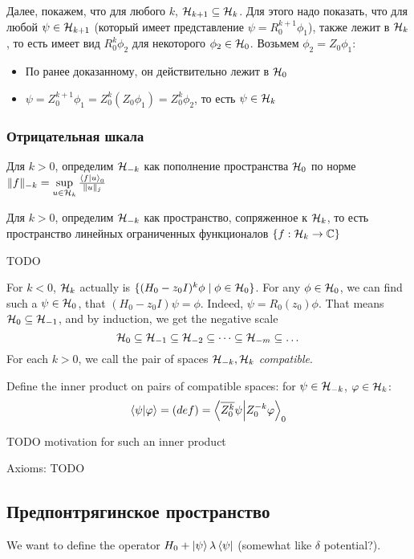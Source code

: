 Далее, покажем, что для любого $k$, $\mathcal{H}_{k + 1} \subseteq \mathcal{H}_{k}$. Для этого надо показать, что для любой $\psi \in \mathcal{H}_{k + 1}$ (который имеет представление $\psi = R_0^{k + 1} \phi_1$), также лежит в $\mathcal{H}_{k}$, то есть имеет вид $R_0^k \phi_2$ для некоторого $\phi_2 \in \mathcal{H}_{0}$. Возьмем $\phi_2 = Z_0 \phi_1$:
\begin{itemize}
\item По ранее доказанному, он действительно лежит в $\mathcal{H}_{0}$
\item $\psi = Z_0^{k + 1} \phi_1 = Z_0^k (Z_0 \phi_1) = Z_0^k \phi_2$, то есть $\psi \in \mathcal{H}_{k}$
\end{itemize}

\subsubsection{Отрицательная шкала}
Для $k > 0$, определим $\mathcal{H}_{-k}$ как пополнение пространства $\mathcal{H}_{0}$ по норме $\|f \|_{-k} = \sup\limits_{u \in \hilb{k}} \frac{\ip{f}{u}_0}{\|u\|_j}$

Для $k > 0$, определим $\mathcal{H}_{-k}$ как пространство, сопряженное к $\mathcal{H}_{k}$, то есть пространство линейных ограниченных функционалов $\{ f: \mathcal{H}_{k} \to \mathbb{C} \}$

TODO

For $k < 0$, $\mathcal{H}_{k}$ actually is $\{ (H_0 - z_0 I)^k \phi \mid \phi \in \mathcal{H}_{0} \}$.
For any $\phi \in \mathcal{H}_{0}$, we can find such a $\psi \in \mathcal{H}_{0}$, that $(H_0 - z_0 I) \psi = \phi$. Indeed, $\psi = R_0(z_0) \phi$. That means $\mathcal{H}_{0} \subseteq \mathcal{H}_{-1}$, and by induction, we get the negative scale
\[
\mathcal{H}_{0} \subseteq \mathcal{H}_{-1} \subseteq \mathcal{H}_{-2} \subseteq \dots \subseteq \mathcal{H}_{-m} \subseteq \dots
\] 
For each $k > 0$, we call the pair of spaces $\mathcal{H}_{-k}, \mathcal{H}_{k}$ \textit{compatible}.

Define the inner product on pairs of compatible spaces: for $\psi \in \mathcal{H}_{-k}$, $\varphi \in \mathcal{H}_{k}$:
\[
\ip{\psi}{\varphi} = (def) = \ip{\cconj{Z_0^k} \psi}{Z_0^{-k} \varphi}_0
\]

TODO motivation for such an inner product

Axioms: TODO




\subsection{Предпонтрягинское пространство}
We want to define the operator $H_0 + \ket{\psi} \lambda \bra{\psi}$ (somewhat like $\delta$ potential?).

